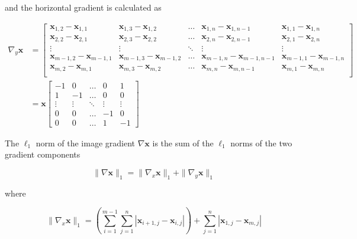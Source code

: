 \documentclass[12pt]{article}
\begin{document}
and the horizontal gradient is calculated as

\begin{equation}
  \begin{aligned}
  \nabla_{y} \mathbf{x} &= \begin{bmatrix}
    \mathbf{x}_{1,2} - \mathbf{x}_{1,1} & \mathbf{x}_{1,3} - \mathbf{x}_{1,2} & \ldots & \mathbf{x}_{1,n} - \mathbf{x}_{1,n-1} & \mathbf{x}_{1,1} - \mathbf{x}_{1,n} \\
    \mathbf{x}_{2,2} - \mathbf{x}_{2,1} & \mathbf{x}_{2,3} - \mathbf{x}_{2,2} & \ldots & \mathbf{x}_{2,n} - \mathbf{x}_{2,n-1} & \mathbf{x}_{2,1} - \mathbf{x}_{2,n}  \\
    \vdots & \vdots & \ddots & \vdots & \vdots \\
    \mathbf{x}_{m-1,2} - \mathbf{x}_{m-1,1} & \mathbf{x}_{m-1,3} - \mathbf{x}_{m-1,2} & \ldots & \mathbf{x}_{m-1,n} - \mathbf{x}_{m-1,n-1} & \mathbf{x}_{m-1,1} - \mathbf{x}_{m-1,n} \\
    \mathbf{x}_{m,2} - \mathbf{x}_{m,1} & \mathbf{x}_{m,3} - \mathbf{x}_{m,2} & \ldots & \mathbf{x}_{m,n} - \mathbf{x}_{m,n-1} & \mathbf{x}_{m,1} - \mathbf{x}_{m,n} \\
  \end{bmatrix} \\
  &=  \mathbf{x} \begin{bmatrix}
    -1 & 0 & \ldots & 0 & 1 \\
    1 & -1 & \ldots & 0 & 0 \\
    \vdots & \vdots & \ddots & \vdots & \vdots \\
    0 & 0 & \ldots & -1 & 0 \\
    0 & 0 & \ldots & 1 & -1
    \end{bmatrix}
  \end{aligned}
\end{equation}




The $\ell_1$ norm of the image gradient $\nabla \mathbf{x}$ is the sum of the $\ell_1$ norms of the two gradient components

\begin{equation}
  \| \nabla \mathbf{x} \|_1 = \| \nabla_x \mathbf{x} \|_1 + \| \nabla_y \mathbf{x} \|_1
\end{equation}

where

\begin{equation}
  \| \nabla_x \mathbf{x} \|_1 = \left( \sum_{i=1}^{m-1} \sum_{j=1}^{n} |\mathbf{x}_{i+1,j} - \mathbf{x}_{i,j}| \right) + \sum_{j=1}^{n} |\mathbf{x}_{1, j} - \mathbf{x}_{m,j}|
\end{equation}
\end{document}
